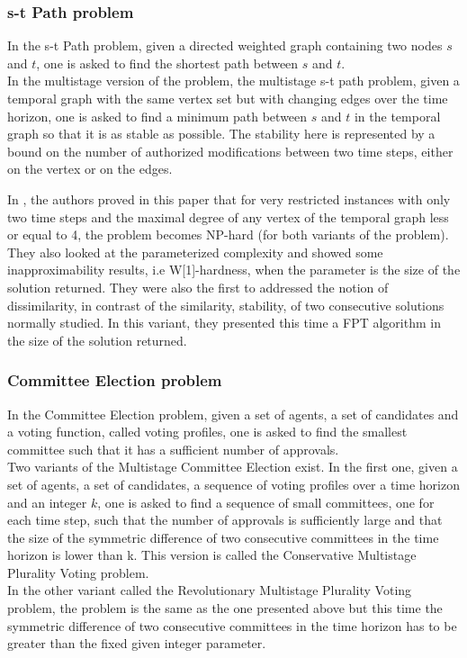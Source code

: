 \documentclass[a4paper]{book}
\begin{document}
\subsubsection{s-t Path problem}
In the {\sc s-t Path} problem, given a directed weighted graph containing two nodes $s$ and $t$, one is asked to find the shortest path between $s$ and $t$.\\
In the multistage version of the problem, the {\sc multistage s-t path problem}, given a temporal graph with the same vertex set but with changing edges over the time horizon, one is asked to find a minimum path between $s$ and $t$ in the temporal graph so that it is as stable as possible. The stability here is represented by a bound on the number of authorized modifications between two time steps, either on the vertex or on the edges. 

In \cite{stpath}, the authors proved in this paper 
that for very restricted instances with only two time steps and the maximal degree of any vertex of the temporal graph less or equal to 4, the problem becomes NP-hard (for both variants of the problem). They also looked at the parameterized complexity and showed some inapproximability results, i.e W[1]-hardness, when the parameter is the size of the solution returned. They were also the first to addressed the notion of dissimilarity, in contrast of the similarity, stability, of two consecutive solutions normally studied. In this variant, they presented this time a FPT algorithm in the size of the solution returned. 

\subsubsection{Committee Election problem}
In the {\sc Committee Election} problem, given a set of agents, a set of candidates and a voting function, called voting profiles, one is asked to find the smallest committee such that it has a sufficient number of approvals.\\
Two variants of the {\sc Multistage Committee Election} exist. In the first one, given a set of agents, a set of candidates, a sequence of voting profiles over a time horizon and an integer $k$, one is asked to find a sequence of small committees, one for each time step, such that the number of approvals is sufficiently large and that the size of the symmetric difference of two consecutive committees in the time horizon is lower than k. This version is called the {\sc Conservative Multistage Plurality Voting} problem.\\
In the other variant called the {\sc Revolutionary Multistage Plurality Voting} problem, the problem is the same as the one presented above but this time the symmetric difference of two consecutive committees in the time horizon has to be greater than the fixed given integer parameter.\\
\end{document}
